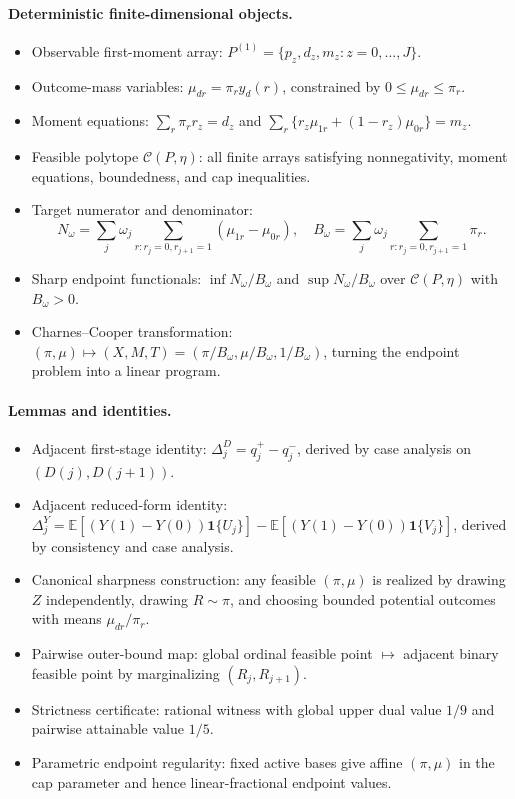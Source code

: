 \documentclass[11pt]{article}
\newcommand{\E}{\mathbb{E}}
\newcommand{\one}{\mathbf{1}}
\theoremstyle{definition}
\theoremstyle{plain}
\theoremstyle{remark}
\begin{document}
\paragraph{Deterministic finite-dimensional objects.}
\begin{itemize}[leftmargin=*]
\item Observable first-moment array:
\(P^{(1)}=\{p_z,d_z,m_z:z=0,\ldots,J\}\).
\item Outcome-mass variables:
\(\mu_{dr}=\pi_r y_d(r)\), constrained by \(0\le\mu_{dr}\le\pi_r\).
\item Moment equations:
\(\sum_r\pi_r r_z=d_z\) and
\(\sum_r\{r_z\mu_{1r}+(1-r_z)\mu_{0r}\}=m_z\).
\item Feasible polytope \(\mathcal C(P,\eta)\): all finite arrays satisfying
nonnegativity, moment equations, boundedness, and cap inequalities.
\item Target numerator and denominator:
\[
N_\omega=\sum_j\omega_j\sum_{r:r_j=0,r_{j+1}=1}(\mu_{1r}-\mu_{0r}),\quad
B_\omega=\sum_j\omega_j\sum_{r:r_j=0,r_{j+1}=1}\pi_r.
\]
\item Sharp endpoint functionals:
\(\inf N_\omega/B_\omega\) and \(\sup N_\omega/B_\omega\) over
\(\mathcal C(P,\eta)\) with \(B_\omega>0\).
\item Charnes--Cooper transformation:
\((\pi,\mu)\mapsto (X,M,T)=(\pi/B_\omega,\mu/B_\omega,1/B_\omega)\), turning
the endpoint problem into a linear program.
\end{itemize}

\paragraph{Lemmas and identities.}
\begin{itemize}[leftmargin=*]
\item Adjacent first-stage identity:
\(\Delta^D_j=q_j^+-q_j^-\), derived by case analysis on
\((D(j),D(j+1))\).
\item Adjacent reduced-form identity:
\(\Delta^Y_j=\E[(Y(1)-Y(0))\one\{U_j\}]
-\E[(Y(1)-Y(0))\one\{V_j\}]\), derived by consistency and case analysis.
\item Canonical sharpness construction: any feasible \((\pi,\mu)\) is realized
by drawing \(Z\) independently, drawing \(R\sim\pi\), and choosing bounded
potential outcomes with means \(\mu_{dr}/\pi_r\).
\item Pairwise outer-bound map: global ordinal feasible point
\(\mapsto\) adjacent binary feasible point by marginalizing
\((R_j,R_{j+1})\).
\item Strictness certificate: rational witness with global upper dual value
\(1/9\) and pairwise attainable value \(1/5\).
\item Parametric endpoint regularity: fixed active bases give affine
\((\pi,\mu)\) in the cap parameter and hence linear-fractional endpoint values.
\end{itemize}
\end{document}
